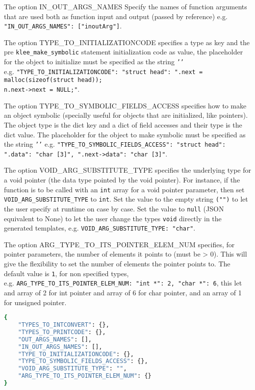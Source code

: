 The option IN\_OUT\_ARGS\_NAMES Specify the names of function arguments that are used both as function input and output (passed by reference) e.g. \texttt{"IN\_OUT\_ARGS\_NAMES": ["inoutArg"]}.

The option TYPE\_TO\_INITIALIZATIONCODE specifies a type as key and the pre \texttt{klee\_make\_symbolic} statement initialization code as value, the placeholder for the object to initialize must be specified as the string \texttt{'{}'}\\
e.g. \texttt{"TYPE\_TO\_INITIALIZATIONCODE": {"struct head": "{}.next = malloc(sizeof(struct head));\\n{}.next->next = NULL;"}}.

The option TYPE\_TO\_SYMBOLIC\_FIELDS\_ACCESS specifies how to make an object symbolic (specially useful for objects that are initialized, like pointers). The object type is the dict key and a dict of field accesses and their type is the dict value. The placeholder for the object to make symbolic must be specified as the string \texttt{'{}'} e.g. \texttt{"TYPE\_TO\_SYMBOLIC\_FIELDS\_ACCESS": {"struct head": {"{}.data": "char [3]", "{}.next->data": "char [3]"}}}.

The option VOID\_ARG\_SUBSTITUTE\_TYPE specifies the underlying type for a void pointer (the data type pointed by the void pointer). For instance, if the function is to be called with an \texttt{int} array for a void pointer parameter, then set \texttt{VOID\_ARG\_SUBSTITUTE\_TYPE} to \texttt{int}. Set the value to the empty string \texttt{("")} to let the user specify at runtime on case by case. Set the value to \texttt{null} (JSON equivalent to None) to let the user change the types \texttt{void} directly in the generated templates, e.g. \texttt{VOID\_ARG\_SUBSTITUTE\_TYPE: "char"}.

The option ARG\_TYPE\_TO\_ITS\_POINTER\_ELEM\_NUM specifies, for pointer parameters, the number of elements it points to (must be > 0). This will give the flexibility to set the number of elements the pointer points to. The default value is \texttt{1}, for non specified types, \\
e.g. \texttt{ARG\_TYPE\_TO\_ITS\_POINTER\_ELEM\_NUM: {"int *": 2, "char *": 6}}, this let and array of 2 for int pointer and array of 6 for char pointer, and an array of 1 for unsigned pointer.

\begin{lstlisting}[language=bash,label=listing:json:conf,caption=generate\_template\_config.json file.]
{
    "TYPES_TO_INTCONVERT": {},
    "TYPES_TO_PRINTCODE": {},
    "OUT_ARGS_NAMES": [],
    "IN_OUT_ARGS_NAMES": [],
    "TYPE_TO_INITIALIZATIONCODE": {},
    "TYPE_TO_SYMBOLIC_FIELDS_ACCESS": {},
    "VOID_ARG_SUBSTITUTE_TYPE": "",
    "ARG_TYPE_TO_ITS_POINTER_ELEM_NUM": {}
}
\end{lstlisting}

